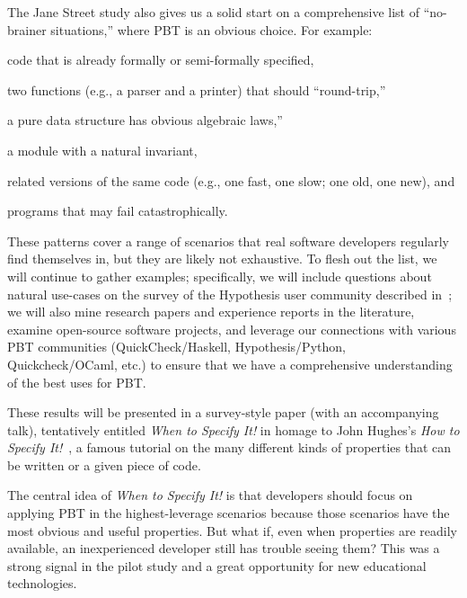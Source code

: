 The Jane Street study also gives us a solid start on a comprehensive list of
``no-brainer situations,'' where PBT is an obvious choice. For example:
\begin{enumerate*}[label=(\arabic{enumi})]
\item code that is already formally or semi-formally specified,
\item two functions (e.g., a parser and a printer) that should ``round-trip,''
\item a pure data structure has obvious algebraic laws,''
\item a module with a natural invariant,
\item related versions of the same code (e.g., one fast, one slow; one old, one
new),
and
\item programs that may fail catastrophically.
\end{enumerate*}
These patterns cover a range of
scenarios that real software developers regularly find themselves in, but they
are likely not exhaustive. To flesh out the list, we will continue to
gather examples; specifically, we will include
questions about natural use-cases on the survey of the Hypothesis user
community described in~; we will also mine
research papers and experience reports in the literature,
examine open-source software projects, and leverage our connections with various
PBT communities (QuickCheck/Haskell, Hypothesis/Python, Quickcheck/OCaml, etc.)
to ensure that we have a comprehensive understanding of the best uses for PBT.

These results will be presented in a survey-style paper (with an
accompanying talk), tentatively entitled {\em When to Specify It!} in
homage to John Hughes's {\em How to Specify
  It!}~\cite{HowToSpecifyIt}, a famous tutorial on the many different
kinds of properties that can be written or a given piece of code.


The central idea of {\em When to Specify It!} is that developers should focus on
applying PBT in the highest-leverage scenarios because those scenarios have the
most obvious and useful properties. But what if, even when properties are
readily available, an inexperienced developer still has trouble seeing them?
This was a strong signal in the pilot study and a great opportunity for new
educational technologies.

